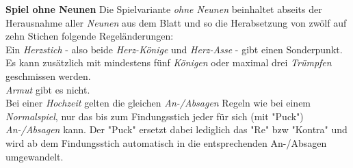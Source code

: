 \documentclass[11pt,a4paper,landscape]{article}
\begin{document}
\begin{multicols}{3}
\textbf{Spiel ohne Neunen} Die Spielvariante \textit{ohne Neunen} beinhaltet abseits der Herausnahme aller \textit{Neunen} aus dem Blatt und so die Herabsetzung von zwölf auf zehn Stichen folgende Regeländerungen: \\
Ein \textit{Herzstich} - also beide \textit{Herz-Könige} und \textit{Herz-Asse} - gibt einen Sonderpunkt. \\ Es kann zusätzlich mit mindestens fünf \textit{Königen} oder maximal drei \textit{Trümpfen} geschmissen werden. \\ \textit{Armut} gibt es nicht. \\ Bei einer \textit{Hochzeit} gelten die gleichen \textit{An-/Absagen} Regeln wie bei einem \textit{Normalspiel}, nur das bis zum Findungsstich jeder für sich (mit "Puck") \textit{An-/Absagen} kann. Der "Puck" ersetzt dabei lediglich das "Re" bzw "Kontra" und wird ab dem Findungsstich automatisch in die entsprechenden An-/Absagen umgewandelt.
\end{multicols}
\end{document}
